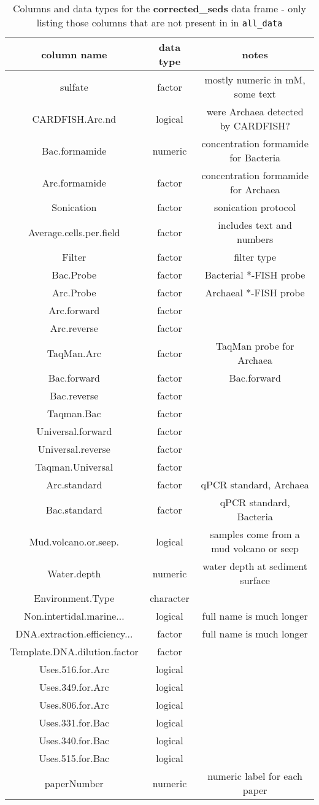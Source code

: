 \documentclass{article}
\begin{document}
\begin{longtable}{ccc}
\caption{Columns and data types for the \textbf{corrected\_seds} data frame - only listing those columns that are not present in in \texttt{all\_data}} \\
\hline
column name & data type & notes \\ 
\hline
sulfate & factor & mostly numeric in mM, some text\\
CARDFISH.Arc.nd & logical & were Archaea detected by CARDFISH?\\
Bac.formamide & numeric & concentration formamide for Bacteria\\
Arc.formamide & factor & concentration formamide for Archaea\\
Sonication & factor & sonication protocol \\
Average.cells.per.field & factor & includes text and numbers\\
Filter & factor & filter type\\
Bac.Probe & factor & Bacterial *-FISH probe\\
Arc.Probe & factor & Archaeal *-FISH probe\\
Arc.forward & factor & \\
Arc.reverse & factor & \\
TaqMan.Arc & factor & TaqMan probe for Archaea\\
Bac.forward & factor & Bac.forward \\
Bac.reverse & factor & \\
Taqman.Bac & factor & \\
Universal.forward & factor & \\
Universal.reverse & factor & \\
Taqman.Universal & factor & \\
Arc.standard & factor & qPCR standard, Archaea\\
Bac.standard & factor & qPCR standard, Bacteria\\
Mud.volcano.or.seep. & logical & samples come from a mud volcano or seep\\
Water.depth & numeric & water depth at sediment surface\\
Environment.Type & character & \\
Non.intertidal.marine... & logical & full name is much longer\\
DNA.extraction.efficiency... & factor & full name is much longer\\
Template.DNA.dilution.factor & factor & \\
Uses.516.for.Arc & logical & \\
Uses.349.for.Arc & logical & \\
Uses.806.for.Arc & logical & \\
Uses.331.for.Bac & logical & \\
Uses.340.for.Bac & logical & \\
Uses.515.for.Bac & logical & \\
paperNumber & numeric & numeric label for each paper\\
\end{longtable}
\end{document}
